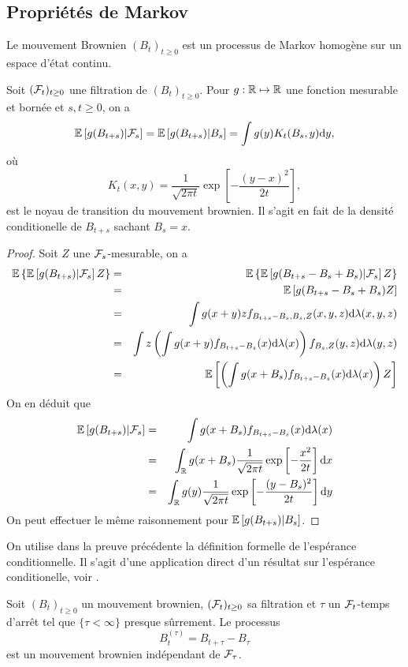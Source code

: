 \subsection{Propriétés de Markov}
Le mouvement Brownien $(B_t)_{t\geq 0}$ est un processus de Markov homogène sur un espace d'état continu.  
\begin{prop}
Soit $(\mathcal{F}_t)_{t\geq 0}$ une filtration de $(B_t)_{t\geq 0}$. Pour $g:\mathbb{R}\mapsto\mathbb{R}$ une fonction mesurable et bornée et $s, t\geq 0$, on a 
$$
\mathbb{E}\left[g(B_{t+s})|\mathcal{F}_s\right]=\mathbb{E}\left[g(B_{t+s})|B_s\right] = \int g(y)K_{t}(B_s,y)\text{d}y,
$$
où 
$$
K_{t}(x, y) = \frac{1}{\sqrt{2\pi t}}\exp\left[-\frac{(y-x)^2}{2t}\right],
$$
est le noyau de transition du mouvement brownien. Il s'agit en fait de la densité conditionelle de $B_{t+s}$ sachant $B_s = x$.
\end{prop}
\begin{proof}
Soit $Z$ une \va $\mathcal{F}_s$-mesurable, on a 
\begin{eqnarray*}
\mathbb{E}\left\{\mathbb{E}\left[g(B_{t+s})|\mathcal{F}_s\right]Z\right\}&=&\mathbb{E}\left\{\mathbb{E}\left[g(B_{t+s}-B_s + B_s)|\mathcal{F}_s\right]Z\right\}\\
&=&\mathbb{E}\left[g(B_{t+s}-B_s + B_s)Z\right]\\
&=&\int g(x + y)zf_{B_{t+s}-B_s, B_s,Z}(x,y,z)\text{d}\lambda(x,y,z)\\
&=&\int z \left(\int g(x + y)f_{B_{t+s}-B_s}(x)\text{d}\lambda(x)\right)f_{B_s,Z}(y,z)\text{d}\lambda(y,z)\\
&=&\mathbb{E}\left[ \left(\int g(x + B_s)f_{B_{t+s}-B_s}(x)\text{d}\lambda(x)\right)Z\right]\\
\end{eqnarray*}
On en déduit que 
\begin{eqnarray*}
\mathbb{E}\left[g(B_{t+s})|\mathcal{F}_s\right] &=& \int g(x + B_s)f_{B_{t+s}-B_s}(x)\text{d}\lambda(x)\\
 &=&\int_{\mathbb{R}} g(x + B_s)\frac{1}{\sqrt{2\pi t}}\exp\left[-\frac{x^2}{2t}\right]\text{d}x \\
 &=&\int_{\mathbb{R}} g(y)\frac{1}{\sqrt{2\pi t}}\exp\left[-\frac{(y - B_s)^2}{2t}\right]\text{d}y
\end{eqnarray*}
On peut effectuer le même raisonnement pour $\mathbb{E}\left[g(B_{t+s})|B_s\right]$.
\end{proof}
On utilise dans la preuve précédente la  définition formelle de l'espérance conditionnelle. Il s'agit d'une application direct d'un résultat sur l'espérance conditionelle, voir \citet[Theorème 11.3.4]{LeGall2006}.
\begin{theo}
Soit $(B_t)_{t\geq 0}$ un mouvement brownien, $(\mathcal{F}_t)_{t\geq0}$ sa filtration et $\tau$ un $\mathcal{F}_t$-temps d'arrêt tel que $\{\tau < \infty\}$ presque sûrrement. Le processus 
$$
B_t^{(\tau)} = B_{t+\tau} - B_{\tau}
$$
est un mouvement brownien indépendant de $\mathcal{F}_{\tau}$.
\end{theo}
